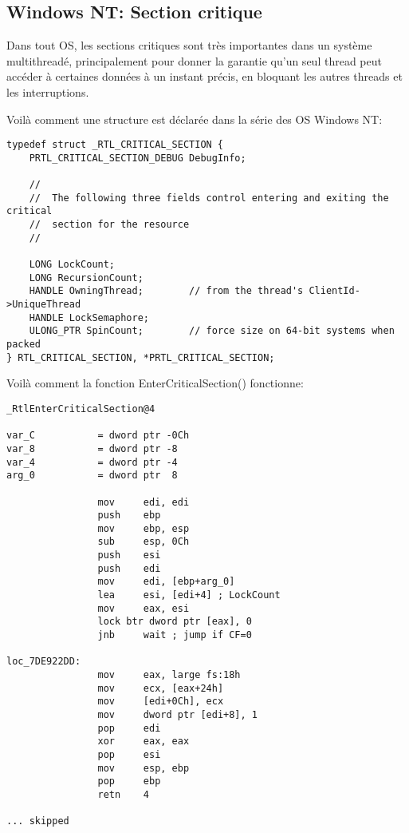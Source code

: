 \subsection{Windows NT: Section critique}

\label{critical_sections}


Dans tout \ac{OS}, les sections critiques sont très importantes dans un système
multithreadé,
principalement  pour donner la garantie qu'un seul thread peut
accéder à certaines données à un instant précis, en bloquant les autres
threads et les interruptions.

\par
Voilà comment une structure  est déclarée dans la série des
OS \gls{Windows NT}:

\begin{lstlisting}[caption=(Windows Research Kernel v1.2) public/sdk/inc/nturtl.h,style=customc]
typedef struct _RTL_CRITICAL_SECTION {
    PRTL_CRITICAL_SECTION_DEBUG DebugInfo;

    //
    //  The following three fields control entering and exiting the critical
    //  section for the resource
    //

    LONG LockCount;
    LONG RecursionCount;
    HANDLE OwningThread;        // from the thread's ClientId->UniqueThread
    HANDLE LockSemaphore;
    ULONG_PTR SpinCount;        // force size on 64-bit systems when packed
} RTL_CRITICAL_SECTION, *PRTL_CRITICAL_SECTION;
\end{lstlisting}

Voilà comment la fonction EnterCriticalSection() fonctionne:

\begin{lstlisting}[caption=Windows 2008/ntdll.dll/x86 (begin),style=customasmx86]
_RtlEnterCriticalSection@4

var_C           = dword ptr -0Ch
var_8           = dword ptr -8
var_4           = dword ptr -4
arg_0           = dword ptr  8

                mov     edi, edi
                push    ebp
                mov     ebp, esp
                sub     esp, 0Ch
                push    esi
                push    edi
                mov     edi, [ebp+arg_0]
                lea     esi, [edi+4] ; LockCount
                mov     eax, esi
                lock btr dword ptr [eax], 0
                jnb     wait ; jump if CF=0

loc_7DE922DD:
                mov     eax, large fs:18h
                mov     ecx, [eax+24h]
                mov     [edi+0Ch], ecx
                mov     dword ptr [edi+8], 1
                pop     edi
                xor     eax, eax
                pop     esi
                mov     esp, ebp
                pop     ebp
                retn    4

... skipped
\end{lstlisting}


